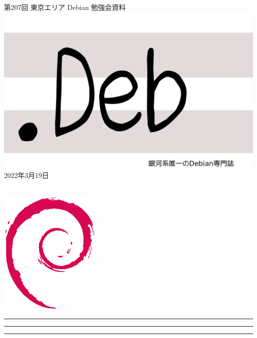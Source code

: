 \documentclass[mingoth,a4paper]{jsarticle}
\newcommand{\debmtgyear}{2022}
\newcommand{\debmtgmonth}{3}
\newcommand{\debmtgdate}{19}
\newcommand{\debmtgnumber}{207}
\begin{document}
\begin{titlepage}
\thispagestyle{empty}

\vspace*{-2cm}
第\debmtgnumber{}回 東京エリア Debian 勉強会資料\\
\hspace*{-2cm}
\includegraphics{image-assets/dotdeb.pdf}\\
\hfill{}\debmtgyear{}年\debmtgmonth{}月\debmtgdate{}日

\\

\vspace*{-2cm}
\hfill{}\includegraphics[height=6cm]{image-assets/openlogo-nd.eps}
\end{titlepage}

\newpage

\begin{minipage}[b]{0.2\hsize}
 \colorbox{titleback}{}
\end{minipage}
\begin{minipage}[b]{0.8\hsize}
\hrule
\vspace{2mm}
\hrule
\begin{multicols}{2}
\tableofcontents
\end{multicols}
\vspace{2mm}
\hrule
\end{minipage}
\end{document}
